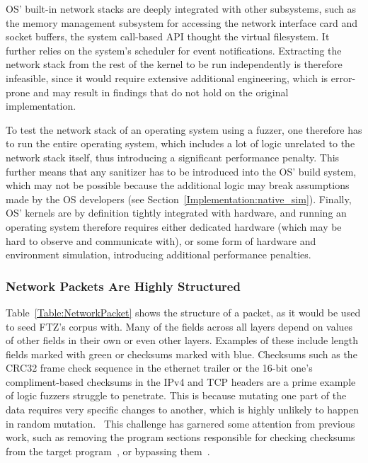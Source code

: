 \documentclass{article}
\newcommand{\proj}{FTZ\xspace}
\let\savedCite=\cite
\renewcommand{\cite}{\unskip~\savedCite}
\begin{document}
\begin{multicols}{2}
  OS' built-in network stacks are deeply integrated with other subsystems, such as the memory management subsystem for accessing the network interface card and socket buffers, the system call-based API thought the virtual filesystem. It further relies on the system's scheduler for event notifications. Extracting the network stack from the rest of the kernel to be run independently is therefore infeasible, since it would require extensive additional engineering, which is error-prone and may result in findings that do not hold on the original implementation.\cite{KernelVsUserNetworking}

  To test the network stack of an operating system using a fuzzer, one therefore has to run the entire operating system, which includes a lot of logic unrelated to the network stack itself, thus introducing a significant performance penalty. This further means that any sanitizer has to be introduced into the OS' build system, which may not be possible because the additional logic may break assumptions made by the OS developers (see Section~\ref{Implementation:native_sim}). Finally, OS' kernels are by definition tightly integrated with hardware, and running an operating system therefore requires either dedicated hardware (which may be hard to observe and communicate with), or some form of hardware and environment simulation, introducing additional performance penalties.

  \subsubsection{Network Packets Are Highly Structured}
  \label{Background:TcpIsStructured}

  Table~\ref{Table:NetworkPacket} shows the structure of a packet, as it would be used to seed \proj's corpus with. Many of the fields across all layers depend on values of other fields in their own or even other layers. Examples of these include length fields marked with green or checksums marked with blue. Checksums such as the CRC32 frame check sequence in the ethernet trailer or the 16-bit one's compliment-based checksums in the IPv4 and TCP headers are a prime example of logic fuzzers struggle to penetrate. This is because mutating one part of the data requires very specific changes to another, which is highly unlikely to happen in random mutation.\cite{StateOfTheArt} This challenge has garnered some attention from previous work, such as removing the program sections responsible for checking checksums from the target program\cite{TFuzz}, or bypassing them\cite{REDQUEEN}.


\end{multicols}
\end{document}
